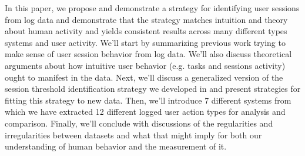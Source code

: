 In this paper, we propose and demonstrate a strategy for identifying user sessions from log data and demonstrate that the strategy matches intuition and theory about human activity and yields consistent results across many different types systems and user activity.  We'll start by summarizing previous work trying to make sense of user session behavior from log data.  We'll also discuss theoretical arguments about how intuitive user behavior (e.g. tasks and sessions activity) ought to manifest in the data.  Next, we'll discuss a generalized version of the session threshold identification strategy we developed in \cite{geiger2013using} and present strategies for fitting this strategy to new data.  Then, we'll introduce 7 different systems from which we have extracted 12 different logged user action types for analysis and comparison. Finally, we'll conclude with discussions of the regularities and irregularities between datasets and what that might imply for both our understanding of human behavior and the measurement of it.
